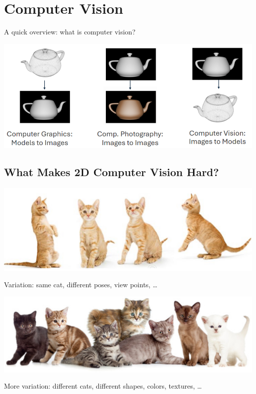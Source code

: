 \documentclass[10pt]{article}
\begin{document}
\section*{Computer Vision}
A quick overview: what is computer vision?
\begin{center} 
	\includegraphics*[width=\textwidth]{L1_24.png} 
\end{center}

\subsection*{What Makes 2D Computer Vision Hard?}
\begin{center} 
	\includegraphics*[width=\textwidth]{L1_25.png} 
\end{center}
Variation: same cat, different poses, view points, \dots
\begin{center} 
	\includegraphics*[width=\textwidth]{L1_26.png} 
\end{center}
More variation: different cats, different shapes, colors, textures, \dots\\\\
\end{document}
